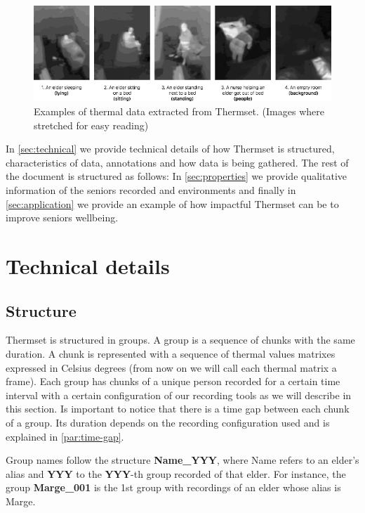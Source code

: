 \documentclass[oneside, twocolumn]{article}
\begin{document}
\begin{figure}
  \centering
    \includegraphics[width=1.0\textwidth]{images/examples}
  \caption{Examples of thermal data extracted from Thermset. (Images where stretched for easy reading)}
  \label{fig:examples}
\end{figure}



In \autoref{sec:technical} we provide technical details of how Thermset is structured, characteristics of data, annotations and how data is being gathered. The rest of the document is structured as follows: In \autoref{sec:properties} we provide qualitative information of the seniors recorded and environments and finally in \autoref{sec:application} we provide an example of how impactful Thermset can be to improve seniors wellbeing.


\section{Technical details}
\label{sec:technical}
\subsection{Structure}
Thermset is structured in groups. A group is a sequence of chunks with the same duration.
A chunk is represented with a sequence of thermal values matrixes expressed in Celsius degrees
(from now on we will call each thermal matrix a frame). Each group has chunks of a unique person
recorded for a certain time interval with a certain configuration of our recording tools as we will
describe in this section. Is important to notice that there is a time gap between each chunk of a
group. Its duration depends on the recording configuration used and is explained in \autoref{par:time-gap}.

Group names follow the structure \textbf{Name\_YYY}, where Name refers to an elder's alias and \textbf{YYY}
to the \textbf{YYY}-th group recorded of that elder. For instance, the group \textbf{Marge\_001} is the
1st group with recordings of an elder whose alias is Marge.
\end{document}
